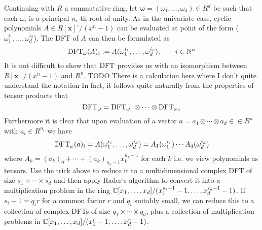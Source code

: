 Continuing with $R$ a commutative ring, let $\mathbf{\omega} = (\omega_1, \ldots, \omega_d) \in R^d$ be such that each $\omega_i$ is a principal $n_i$-th root of unity. As in the univariate case, cyclic polynomials $A \in R[\mathbf{x}]^\circ/(x^n - 1)$ can be evaluated at point of the form ($\omega_1^{i_1}, \ldots, \omega_d^{i_d}$). The DFT of $A$ can then be formulated as
\[
    \textrm{DFT}_{\mathbf{\omega}}(A)_i := A(\omega_1^{i_1}, \ldots, \omega_d^{i_d}), \qquad i \in {\mathbb N}^n
\]
It is not difficult to show that $\textrm{DFT}$ provides us with an isomorphism between $R[\mathbf{x}]/(x^n - 1)$ and $R^n$. TODO There is a calculation here where I don't quite understand the notation
In fact, it follows quite naturally from the properties of tensor products that
\[
    \textrm{DFT}_{\mathbf{\omega}} = \textrm{DFT}_{\omega_1} \otimes \cdots \otimes \textrm{DFT}_{\omega_d}
\]
Furthermore it is clear that upon evaluation of a vector $a = a_1 \otimes \cdots \otimes a_d \in \in R^n$ with $a_i \in R^{n_i}$ we have
\[
    \textrm{DFT}_{\mathbf{\omega}}(a)_i = A(\omega_1^{i_1}, \ldots, \omega_d^{i_d}) = A_1(\omega_1^{i_1}) \cdots A_d(\omega_d^{i_d})
\]
where $A_k = (a_k)_0 + \cdots + (a_k)_{n_k - 1}x_k^{n_k - 1}$ for each $k$ i.e. we view polynomials as tensors.
Use the trick above to reduce it to a multidimensional complex DFT of size $s_1 \times \cdots \times s_d$ and then apply Rader's algorithm to convert it into a multiplication problem in the ring ${\mathbb C}[x_1, \ldots, x_d] / (x_1^{s_1 - 1} - 1, \ldots, x_d^{s_d - 1} - 1)$. If $s_i - 1 = q_i r$ for a common factor $r$ and $q_i$ suitably small, we can reduce this to a collection of complex DFTs of size $q_1 \times \cdots \times q_d$, plus a collection of multiplication problems in ${\mathbb C}[x_1, \ldots, x_d]/(x_1^r - 1, \ldots, x_d^r - 1)$.

